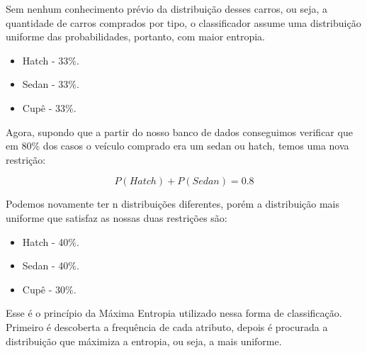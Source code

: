 Sem nenhum conhecimento prévio da distribuição desses carros, ou seja, a
quantidade de carros comprados por tipo, o classificador assume uma distribuição
uniforme das probabilidades, portanto, com maior entropia.

\begin{itemize}
  \item Hatch - 33\%.
  \item Sedan - 33\%.
  \item Cupê - 33\%.
\end{itemize}

Agora, supondo que a partir do nosso banco de dados conseguimos verificar que em
80\% dos casos o veículo comprado era um sedan ou hatch, temos uma nova
restrição:

\[ P(Hatch) + P (Sedan) = 0.8 \]

Podemos novamente ter n distribuições diferentes, porém a distribuição mais
uniforme que satisfaz as nossas duas restrições são:

\begin{itemize}
  \item Hatch - 40\%.
  \item Sedan - 40\%.
  \item Cupê - 30\%.
\end{itemize}

Esse é o princípio da Máxima Entropia utilizado nessa forma de classificação.
Primeiro é descoberta a frequência de cada atributo, depois é procurada a
distribuição que máximiza a entropia, ou seja, a mais uniforme.







